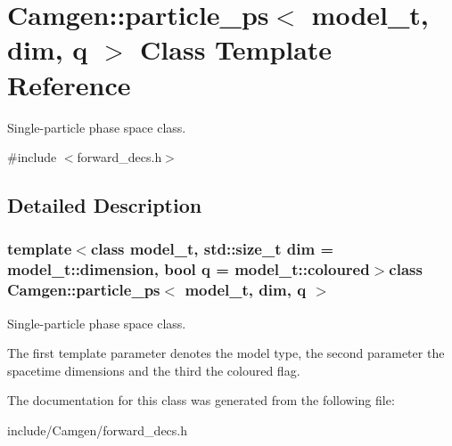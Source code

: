 \hypertarget{a00406}{}\section{Camgen\+:\+:particle\+\_\+ps$<$ model\+\_\+t, dim, q $>$ Class Template Reference}
\label{a00406}


Single-\/particle phase space class.  




{\ttfamily \#include $<$forward\+\_\+decs.\+h$>$}



\subsection{Detailed Description}
\subsubsection*{template$<$class model\+\_\+t, std\+::size\+\_\+t dim = model\+\_\+t\+::dimension, bool q = model\+\_\+t\+::coloured$>$class Camgen\+::particle\+\_\+ps$<$ model\+\_\+t, dim, q $>$}

Single-\/particle phase space class. 

The first template parameter denotes the model type, the second parameter the spacetime dimensions and the third the coloured flag. 

The documentation for this class was generated from the following file\+:\begin{DoxyCompactItemize}
\item 
include/\+Camgen/forward\+\_\+decs.\+h\end{DoxyCompactItemize}
